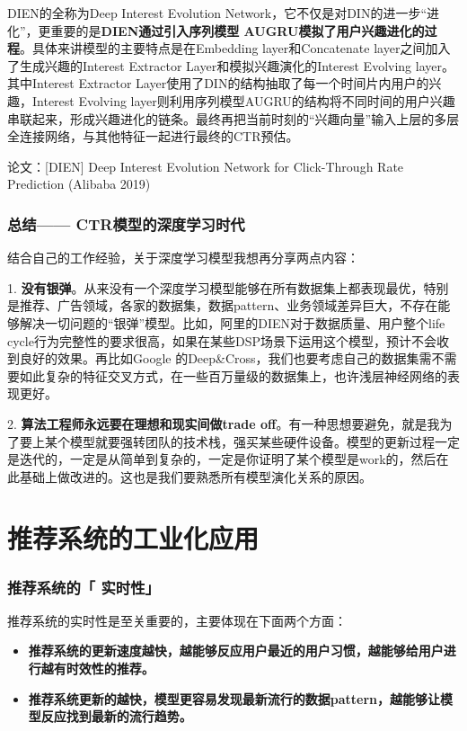\documentclass[12pt]{article}
\begin{document}
DIEN的全称为Deep Interest Evolution Network，它不仅是对DIN的进一步“进化”，更重要的是\textbf{DIEN通过引入序列模型 AUGRU模拟了用户兴趣进化的过程}。具体来讲模型的主要特点是在Embedding layer和Concatenate layer之间加入了生成兴趣的Interest Extractor Layer和模拟兴趣演化的Interest Evolving layer。其中Interest Extractor Layer使用了DIN的结构抽取了每一个时间片内用户的兴趣，Interest Evolving layer则利用序列模型AUGRU的结构将不同时间的用户兴趣串联起来，形成兴趣进化的链条。最终再把当前时刻的“兴趣向量”输入上层的多层全连接网络，与其他特征一起进行最终的CTR预估。

论文：[DIEN] Deep Interest Evolution Network for Click-Through Rate Prediction (Alibaba 2019)

\section{总结—— CTR模型的深度学习时代}
结合自己的工作经验，关于深度学习模型我想再分享两点内容：

1. \textbf{没有银弹}。从来没有一个深度学习模型能够在所有数据集上都表现最优，特别是推荐、广告领域，各家的数据集，数据pattern、业务领域差异巨大，不存在能够解决一切问题的“银弹”模型。比如，阿里的DIEN对于数据质量、用户整个life cycle行为完整性的要求很高，如果在某些DSP场景下运用这个模型，预计不会收到良好的效果。再比如Google 的Deep\&Cross，我们也要考虑自己的数据集需不需要如此复杂的特征交叉方式，在一些百万量级的数据集上，也许浅层神经网络的表现更好。

2. \textbf{算法工程师永远要在理想和现实间做trade off}。有一种思想要避免，就是我为了要上某个模型就要强转团队的技术栈，强买某些硬件设备。模型的更新过程一定是迭代的，一定是从简单到复杂的，一定是你证明了某个模型是work的，然后在此基础上做改进的。这也是我们要熟悉所有模型演化关系的原因。


\part{推荐系统的工业化应用}
\section{推荐系统的「 实时性」\cite{Real_Time_Requirement_Of_Recommender_System}\cite{Real_Time_Requirement_Of_Model_Update}}
推荐系统的实时性是至关重要的，主要体现在下面两个方面：
\begin{itemize}
\setlength{\itemsep}{0pt}
\setlength{\parsep}{0pt}
\setlength{\parskip}{0pt}
    \item \textbf{推荐系统的更新速度越快，越能够反应用户最近的用户习惯，越能够给用户进行越有时效性的推荐。}
    \item \textbf{推荐系统更新的越快，模型更容易发现最新流行的数据pattern，越能够让模型反应找到最新的流行趋势。}
\end{itemize}
\end{document}
